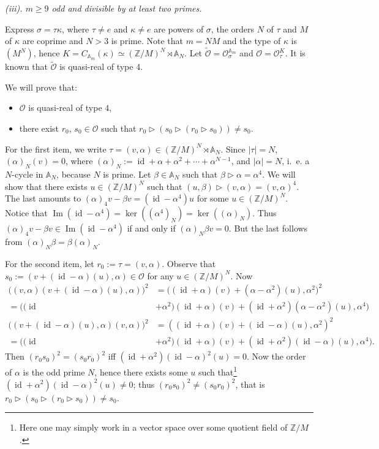 \documentclass[11pt]{amsart} \textheight 22cm
\newcommand{\Imm}{\operatorname{Im}}
\renewcommand{\^}[1]{\mbox{$^{\left( #1 \right)}$}}
\renewcommand{\_}[1]{\mbox{$_{\left( #1 \right)}$}}
\newcommand{\trid}{\triangleright}
\newcommand{\Z}{{\mathbb Z}}
\newcommand{\oc}{{\mathcal O}}
\theoremstyle{plain}
\theoremstyle{definition}
\theoremstyle{remark}
\newcommand\id{\operatorname{id}}
\newcommand\am{\mathbb A_m}
\newcommand\A{\mathbb A}
\theoremstyle{remark}
\begin{document}
\medbreak \textit{(iii). $m\ge 9$ odd and divisible by at least
two primes.}

Express $\sigma = \tau\kappa$, where $\tau\neq e$ and $\kappa\neq
e$ are powers of $\sigma$, the orders $N$ of $\tau$ and $M$ of
$\kappa$ are coprime and $N>3$ is prime. Note that $m=NM$ and the
type of $\kappa$ is $(M^N)$, hence $K =  C_{\A_m}(\kappa) \simeq
(\Z/M)^N \rtimes \A_{N}$. Let $\widetilde{\oc} = \oc_\sigma^{\am}$
and $\oc = \oc_\tau^{K}$. It is known that $\widetilde{\oc}$ is
quasi-real of type $4$.

We will prove that:
\begin{itemize}
\item $\oc$ is quasi-real of type $4$,
\item there exist $r_0$, $s_0\in \oc$ such that $r_0\trid(s_0\trid(r_0\trid s_0)) \neq s_0$.
\end{itemize}

For the first item, we write $\tau =(v, \alpha)\in (\Z/M)^N
\rtimes \A_{N}$. Since $|\tau|=N$, $(\alpha)_N(v)=0$, where
$(\alpha)_N:=\id+\alpha+\alpha^2+\cdots+\alpha^{N-1}$, and
$|\alpha|=N$, i.~e. a $N$-cycle in $\A_N$, because $N$ is prime.
Let $\beta\in \A_N$ such that $\beta\trid \alpha=\alpha^4$. We
will show that there exists $u\in (\Z/M)^N$ such that
$(u,\beta)\trid (v,\alpha)=(v,\alpha)^4$. The last amounts to
$(\alpha)_4v-\beta v=(\id-\alpha^4)u$ for some $u\in(\Z/M)^N$.
Notice that
$\Imm(\id-\alpha^4)=\ker((\alpha^4)_N)=\ker((\alpha)_N)$. %
Thus $(\alpha)_4v-\beta v\in\Imm(\id-\alpha^4)$ if and only if
$(\alpha)_N\beta v=0$. But the last follows from
$(\alpha)_N\beta=\beta(\alpha)_N$.


For the second item, let $r_0 := \tau =(v, \alpha)$. Observe that
$s_0 := (v + (\id-\alpha)(u), \alpha)\in \oc$ for any $u \in
(\Z/M)^N$. Now
\begin{align*}
\big((v, \alpha)(v + (\id - \alpha)(u), \alpha)\big)^2 &= \big((\id + \alpha)(v) + (\alpha-\alpha^2)(u), \alpha^2\big)^2
\\ = \big((\id &+ \alpha^2)(\id + \alpha)(v)  + (\id + \alpha^2)(\alpha-\alpha^2)(u), \alpha^4 \big)
\\
\big((v + (\id - \alpha)(u), \alpha)(v, \alpha)\big)^2 &= ((\id + \alpha)(v) + (\id-\alpha)(u), \alpha^2)^2
\\  = \big((\id &+ \alpha^2)(\id + \alpha)(v)  + (\id + \alpha^2)(\id-\alpha)(u), \alpha^4 \big).
\end{align*}
Then $(r_0s_0)^2 = (s_0r_0)^2$ iff $(\id + \alpha^2)(\id-\alpha)^2(u) = 0$.
Now the order of $\alpha$ is the odd prime $N$, hence there exists some $u$ such
that\footnote{Here one may simply work in a vector space over some quotient field of $\Z/M$.}
$(\id + \alpha^2)(\id-\alpha)^2(u) \neq 0$; thus $(r_0s_0)^2 \neq (s_0r_0)^2$, that is $r_0\trid(s_0\trid(r_0\trid s_0)) \neq s_0$.
\end{document}
